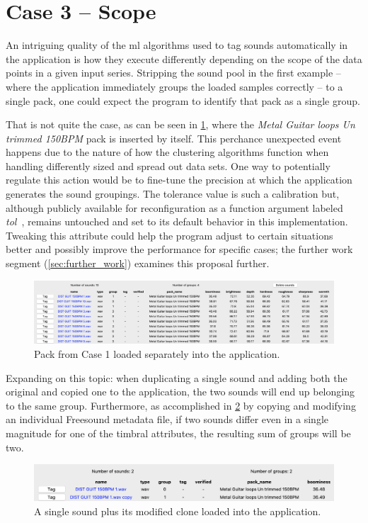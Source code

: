 \newpage\section{Case 3 – Scope}\label{sec:case_3}
An intriguing quality of the \gls{ml} algorithms used to tag sounds automatically in the application is how they execute differently depending on the scope of the data points in a given input series. Stripping the sound pool in the first example – where the application immediately groups the loaded samples correctly – to a single pack, one could expect the program to identify that pack as a single group.

That is not quite the case, as can be seen in \cref{fig:case_3/demo-1}, where the \emph{Metal Guitar loops Un trimmed 150BPM} pack is inserted by itself. This perchance unexpected event happens due to the nature of how the clustering algorithms function when handling differently sized and spread out data sets. One way to potentially regulate this action would be to fine-tune the precision at which the application generates the sound groupings. The tolerance value is such a calibration but, although publicly available for reconfiguration as a function argument labeled \emph{tol}~\cite{mean_shift:api, k-means:api}, remains untouched and set to its default behavior in this implementation. Tweaking this attribute could help the program adjust to certain situations better and possibly improve the performance for specific cases; the further work segment (\cref{sec:further_work}) examines this proposal further.
\begin{figure}[ht]
    \includegraphics[width=\textwidth]{figures/case_3/demo-1}
    \caption{Pack from Case 1 loaded separately into the application.}\label{fig:case_3/demo-1}
\end{figure}

Expanding on this topic: when duplicating a single sound and adding both the original and copied one to the application, the two sounds will end up belonging to the same group. Furthermore, as accomplished in \cref{fig:case_3/demo-2} by copying and modifying an individual Freesound metadata file, if two sounds differ even in a single magnitude for one of the timbral attributes, the resulting sum of groups will be two.
\begin{figure}[ht]
    \includegraphics[width=\textwidth]{figures/case_3/demo-2}
    \caption{A single sound plus its modified clone loaded into the application.}\label{fig:case_3/demo-2}
\end{figure}

